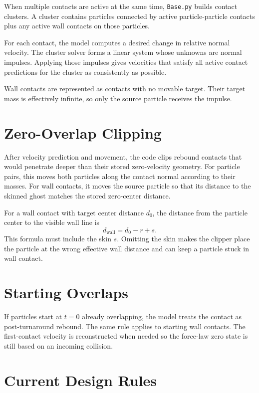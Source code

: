 \documentclass[11pt]{article}
\begin{document}
When multiple contacts are active at the same time, \texttt{Base.py} builds
contact clusters. A cluster contains particles connected by active
particle-particle contacts plus any active wall contacts on those particles.

For each contact, the model computes a desired change in relative normal
velocity. The cluster solver forms a linear system whose unknowns are normal
impulses. Applying those impulses gives velocities that satisfy all active
contact predictions for the cluster as consistently as possible.

Wall contacts are represented as contacts with no movable target. Their target
mass is effectively infinite, so only the source particle receives the impulse.

\section{Zero-Overlap Clipping}

After velocity prediction and movement, the code clips rebound contacts that
would penetrate deeper than their stored zero-velocity geometry. For particle
pairs, this moves both particles along the contact normal according to their
masses. For wall contacts, it moves the source particle so that its distance to
the skinned ghost matches the stored zero-center distance.

For a wall contact with target center distance \(d_0\), the distance from the
particle center to the visible wall line is
\[
    d_{\mathrm{wall}} = d_0 - r + s.
\]
This formula must include the skin \(s\). Omitting the skin makes the clipper
place the particle at the wrong effective wall distance and can keep a particle
stuck in wall contact.

\section{Starting Overlaps}

If particles start at \(t=0\) already overlapping, the model treats the contact
as post-turnaround rebound. The same rule applies to starting wall contacts.
The first-contact velocity is reconstructed when needed so the force-law zero
state is still based on an incoming collision.

\section{Current Design Rules}
\end{document}

